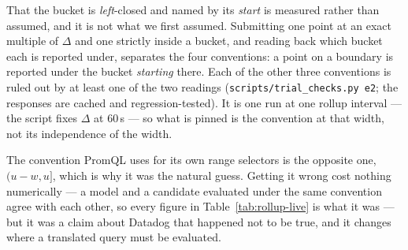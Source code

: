 \begin{remark}\label{rem:closure}
That the bucket is \emph{left}-closed and named by its \emph{start} is measured rather
than assumed, and it is not what we first assumed. Submitting one point at an exact
multiple of $\Delta$ and one strictly inside a bucket, and reading back which bucket each
is reported under, separates the four conventions: a point on a boundary is reported
under the bucket \emph{starting} there. Each of the other three conventions is ruled out
by at least one of the two readings (\texttt{scripts\slash trial\_checks.py e2}; the
responses are cached and regression-tested). It is one run at one rollup interval ---
the script fixes $\Delta$ at $60$\,s --- so what is pinned is the convention at that
width, not its independence of the width.

The convention PromQL uses for its own range selectors is the opposite one, $(u-w,u]$,
which is why it was the natural guess. Getting it wrong cost nothing numerically --- a
model and a candidate evaluated under the same convention agree with each other, so every
figure in Table~\ref{tab:rollup-live} is what it was --- but it was a claim about Datadog
that happened not to be true, and it changes where a translated query must be evaluated.
\end{remark}
